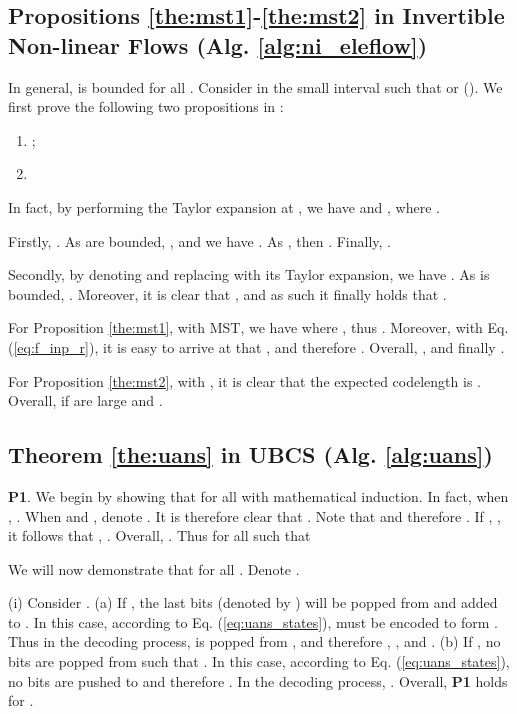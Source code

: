 \documentclass{article}
\begin{document}
\subsection{Propositions \ref{the:mst1}-\ref{the:mst2} in Invertible Non-linear Flows (Alg. \ref{alg:ni_eleflow})}

In general,  is bounded for all . Consider  in the small interval such that  or  (). We first prove the following two propositions in :
\begin{enumerate}
    \item ;
    \item 
\end{enumerate}

In fact, by performing the Taylor expansion at , we have  and , where . 

Firstly, . As  are bounded, , and we have . As , then . Finally, .

Secondly, by denoting  and replacing  with its Taylor expansion, we have . As  is bounded, . Moreover, it is clear that , and as such it finally holds that .

For Proposition \ref{the:mst1}, with MST, we have  where , thus . Moreover, with Eq. (\ref{eq:f_inp_r}), it is easy to arrive at that , and therefore . Overall, , and finally .

For Proposition \ref{the:mst2}, with , it is clear that the expected codelength is . Overall,  if  are large and . 

\subsection{Theorem \ref{the:uans} in UBCS (Alg. \ref{alg:uans})}

\textbf{P1}. We begin by showing that  for all  with mathematical induction. In fact, when , . When  and , denote . It is therefore clear that . Note that  and therefore . If , , it follows that , . Overall, . Thus  for all  such that


We will now demonstrate that  for all . Denote . 

(i) Consider . (a) If , the last  bits (denoted by ) will be popped from  and added to . In this case, according to Eq. (\ref{eq:uans_states}),  must be encoded to form . Thus in the decoding process,  is popped from , and therefore , , and . (b) If , no bits are popped from  such that . In this case, according to Eq. (\ref{eq:uans_states}), no bits are pushed to  and therefore . In the decoding process, . Overall, {\bf P1} holds for .
\end{document}
